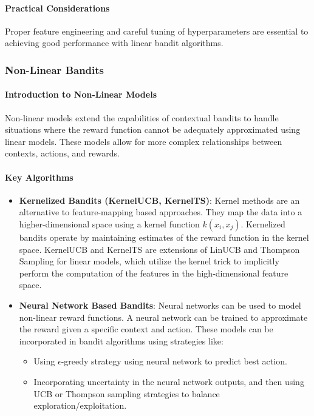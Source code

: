\paragraph{Practical Considerations}
Proper feature engineering and careful tuning of hyperparameters are essential to achieving good performance with linear bandit algorithms.

\subsubsection{Non-Linear Bandits}

\paragraph{Introduction to Non-Linear Models}
Non-linear models extend the capabilities of contextual bandits to handle situations where the reward function cannot be adequately approximated using linear models. These models allow for more complex relationships between contexts, actions, and rewards.

\paragraph{Key Algorithms}
\begin{itemize}
    \item \textbf{Kernelized Bandits (KernelUCB, KernelTS)}:
    Kernel methods are an alternative to feature-mapping based approaches. They map the data into a higher-dimensional space using a kernel function $k(x_i,x_j)$. Kernelized bandits operate by maintaining estimates of the reward function in the kernel space. KernelUCB and KernelTS are extensions of LinUCB and Thompson Sampling for linear models, which utilize the kernel trick to implicitly perform the computation of the features in the high-dimensional feature space.

    \item \textbf{Neural Network Based Bandits}: Neural networks can be used to model non-linear reward functions. A neural network can be trained to approximate the reward given a specific context and action. These models can be incorporated in bandit algorithms using strategies like:
        \begin{itemize}
            \item Using $\epsilon$-greedy strategy using neural network to predict best action.
            \item Incorporating uncertainty in the neural network outputs, and then using UCB or Thompson sampling strategies to balance exploration/exploitation.
        \end{itemize}
\end{itemize}

